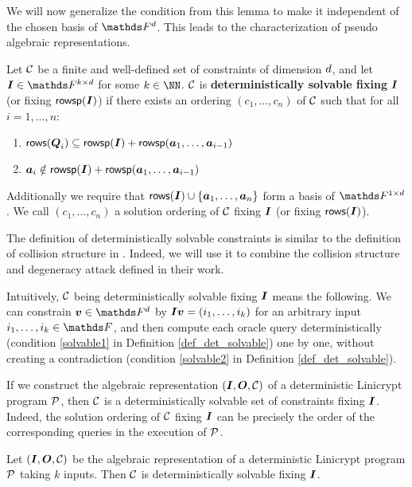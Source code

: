 We will now generalize the condition from this lemma to make it independent of the chosen basis of $\Fsp$.
This leads to the characterization of pseudo algebraic representations.

\begin{defn}
\label{def_det_solvable}
    Let $\C$ be a finite and well-defined set of constraints of dimension $\base$,
    and let $\I \in \F^{k \times \base}$ for some $k \in \NN$.
    $\C$ is \textbf{deterministically solvable fixing} $\I$ (or fixing $\rowsp(\I)$)
    if there exists an ordering $(c_1, \dots, c_n)$ of $\C$
    such that for all $i=1, \dots, n$:
    \begin{enumerate}
    \item
        \label{solvable1}
        $\rows(\Q_i) \subseteq \rowsp(\I) + \rowsp(\va_1, \dots, \va_{i-1})$
    \item
        \label{solvable2}
        $\va_i \notin \rowsp(\I) + \rowsp(\va_1, \dots, \va_{i-1})$
    \end{enumerate}
    Additionally we require that $\rows(\I) \cup \{\va_1, \dots, \va_n\}$ form a basis of $\F^{1\times\base}$.
    We call $(c_1, \dots, c_n)$ a solution ordering of $\C$ fixing $\I$ (or fixing $\rows(\I)$).
\end{defn}

The definition of deterministically solvable constraints is similar to the definition of collision structure in \cite{TCC:McQSwoRos19}.
Indeed, we will use it to combine the collision structure and degeneracy attack defined in their work.

Intuitively, $\C$ being deterministically solvable fixing $\I$ means the following.
We can constrain $\vv \in \Fsp$ by $\Inp \vv = (i_1, \dots, i_k)$ for an arbitrary input $i_1, \dots, i_k \in \F$,
and then compute each oracle query deterministically (condition \ref{solvable1} in Definition \ref{def_det_solvable}) one by one,
without creating a contradiction (condition \ref{solvable2} in Definition \ref{def_det_solvable}).

If we construct the algebraic representation $(\I, \O, \C)$ of a deterministic Linicrypt program $\P$,
then $\C$ is a deterministically solvable set of constraints fixing $\I$.
Indeed, the solution ordering of $\C$ fixing $\I$
can be precisely the order of the corresponding queries in the execution of $\P$.

\begin{lemma}
\label{lemma:alg_rep_det_solvable}
    Let $(\I, \O, \C)$ be the algebraic representation of a deterministic Linicrypt program $\P$ taking $k$ inputs.
    Then $\C$ is deterministically solvable fixing $\I$.
\end{lemma}

